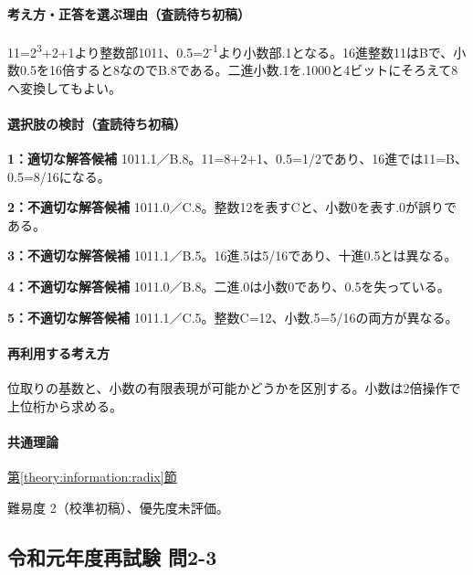 \paragraph{考え方・正答を選ぶ理由（査読待ち初稿）} 11=\allowbreak{}2\textsuperscript{3}+2+1より整数部1011、0.5=\allowbreak{}2\textsuperscript{-1}より小数部.1となる。16進整数11はBで、小数0.5を16倍すると8なのでB.8である。二進小数.1を.1000と4ビットにそろえて8へ変換してもよい。

\paragraph{選択肢の検討（査読待ち初稿）}\mbox{}\par

\noindent\textbf{1：適切な解答候補} 1011.1／B.8。11=\allowbreak{}8+2+1、0.5=\allowbreak{}1/2であり、16進では11=\allowbreak{}B、0.5=\allowbreak{}8/16になる。\par

\noindent\textbf{2：不適切な解答候補} 1011.0／C.8。整数12を表すCと、小数0を表す.0が誤りである。\par

\noindent\textbf{3：不適切な解答候補} 1011.1／B.5。16進.5は5/16であり、十進0.5とは異なる。\par

\noindent\textbf{4：不適切な解答候補} 1011.0／B.8。二進.0は小数0であり、0.5を失っている。\par

\noindent\textbf{5：不適切な解答候補} 1011.1／C.5。整数C=\allowbreak{}12、小数.5=\allowbreak{}5/16の両方が異なる。\par

\paragraph{再利用する考え方} 位取りの基数と、小数の有限表現が可能かどうかを区別する。小数は2倍操作で上位桁から求める。

\paragraph{共通理論} \hyperref[theory:information:radix]{第\ref*{theory:information:radix}節}

\par 難易度 2（校準初稿）、優先度未評価。

\subsection{令和元年度再試験 問2-3}
\label{q:r01-ret-basic-2-3}

